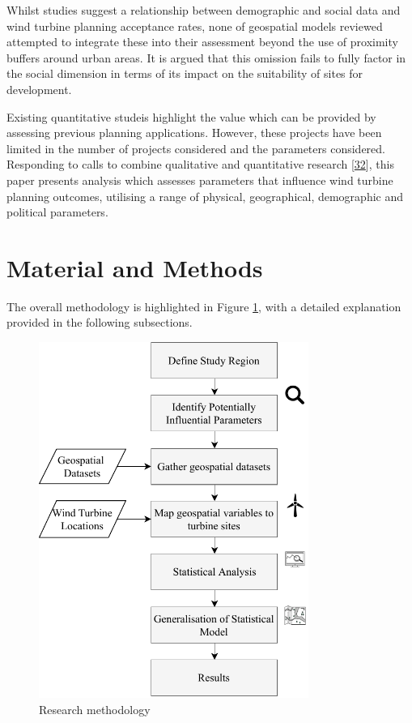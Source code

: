 \documentclass[a4paper,]{article}
\theoremstyle{definition}
\theoremstyle{definition}
\theoremstyle{definition}
\theoremstyle{remark}
\begin{document}
Whilst studies suggest a relationship between demographic and social
data and wind turbine planning acceptance rates, none of geospatial
models reviewed attempted to integrate these into their assessment
beyond the use of proximity buffers around urban areas. It is argued
that this omission fails to fully factor in the social dimension in
terms of its impact on the suitability of sites for development.

Existing quantitative studeis highlight the value which can be provided
by assessing previous planning applications. However, these projects
have been limited in the number of projects considered and the
parameters considered. Responding to calls to combine qualitative and
quantitative research {[}\protect\hyperlink{ref-Langer2016}{32}{]}, this
paper presents analysis which assesses parameters that influence wind
turbine planning outcomes, utilising a range of physical, geographical,
demographic and political parameters.

\section{Material and Methods}\label{material-and-methods}

The overall methodology is highlighted in Figure \ref{fig:Methodology},
with a detailed explanation provided in the following subsections.

\begin{figure}[h]

{\centering \includegraphics[width=8.8cm]{figures/Flowchart/ResearchApproach} 

}

\caption{Research methodology}\label{fig:Methodology}
\end{figure}
\end{document}
